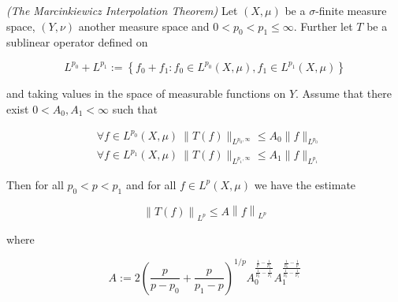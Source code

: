 \begin{mdframed}
	\begin{theorem}\emph{(The Marcinkiewicz Interpolation Theorem)}
		Let $(X,\mu)$ be a $\sigma$-finite measure space, $(Y,\nu)$ another measure space and $0 < p_0 < p_1 \leqslant \infty$. Further let $T$ be a sublinear operator defined on
		
		\begin{equation*}
			L^{p_0} + L^{p_1} := \left\{ f_0 + f_1 : f_0 \in L^{p_0}(X,\mu), f_1 \in L^{p_1}(X,\mu) \right\}
		\end{equation*}
		
		and taking values in the space of measurable functions on $Y$. Assume that there exist $0 < A_0,A_1 < \infty$ such that

		\begin{align}
			&\forall f \in L^{p_0}(X,\mu)~\|T(f)\|_{L^{p_0,\infty}} \leqslant A_0 \|f\|_{L^{p_0}}\label{hyp:fp_0}\\
			&\forall f \in L^{p_1}(X,\mu)~\|T(f)\|_{L^{p_1,\infty}} \leqslant A_1 \|f\|_{L^{p_1}}\label{hyp:fp_1}
		\end{align}

		Then for all $p_0 < p < p_1$ and for all $f \in L^p(X,\mu)$ we have the estimate

		\begin{equation}
			\left\|T(f)\right\|_{L^p} \leqslant A \left\|f\right\|_{L^p}
		\end{equation}

		where

		\begin{equation}
			A := 2\left( \frac{p}{p - p_0} + \frac{p}{p_1 - p} \right)^{1/p}A_0^{\frac{\frac{1}{p} - \frac{1}{p_1}}{\frac{1}{p_0}-\frac{1}{p_1}}}A_1^{\frac{\frac{1}{p_0}-\frac{1}{p}}{\frac{1}{p_0}-\frac{1}{p_1}}}
			\label{eq:constant}
		\end{equation}
	\end{theorem}
\end{mdframed}

